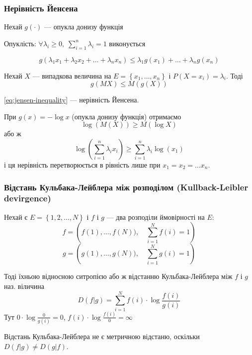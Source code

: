 \subsubsection{Нерівність Йенсена}
\begin{theorem}
  Нехай $g(\cdot)$ --- опукла донизу функція

  Опуклість: $\forall \lambda_i \geq 0, \; \sum_{i=1}^{n} \lambda_i = 1$ виконується

  \[ g(\lambda_1 x_1 + \lambda_2 x_2 + \ldots + \lambda_n x_n) \leq \lambda_1 g(x_1) +
  \ldots + \lambda_n g(x_n) \] 

  Нехай $X$ --- випадкова величина на $E = \left\{ x_1, \ldots, x_n \right\}$
  і $P\left( X = x_i \right)  = \lambda_i$. Тоді
  \begin{equation} \label{eq:jensen-inequality}
  g\left( MX \right) \leq M\left( g(X) \right)
  \end{equation}

  \ref{eq:jensen-inequality} --- нерівність Йенсена.
  
  При $g(x) = - \log x$ (опукла донизу функція) отримаємо
  \[ \log\left( M(X) \right) \geq M\left( \log X \right)  \] 
  або ж
  \[ \log\left( \sum_{i=1}^{n} \lambda_i x_i \right) \geq \sum_{i=1}^{n} \lambda_i \log(x_1) \] 
  і ця нерівність перетворюється в рівність лише при $x_1 = x_2 = \ldots x_n$.
\end{theorem}

\subsubsection{Відстань Кульбака-Лейблера між розподілом (Kullback-Leibler devirgence)}

\begin{definition}
  Нехай є $E = \left\{ 1, 2, \ldots, N \right\} $ і $f$ і $g$ --- два розподіли ймовірності на $E$:
 \[ f = \left( f(1), \ldots, f(N)), \quad \sum_{i=1}^{N} f(i) = 1 \right)  \] 
 \[ g = \left( g(1), \ldots, g(N)), \quad \sum_{i=1}^{N} g(i) = 1 \right)  \] 

 Тоді їхньою відносною ситропією або ж відстанню Кульбака-Лейблера між $f$ і $g$ наз. віличина
 \[ D\left( f|g \right) = \sum_{i=1}^{N} f(i) \cdot \log \frac{f(i)}{g(i)} \] 
 Тут $0 \cdot \log \frac{0}{g(i)} = 0$, $f(i) \cdot \log \frac{f(i)}{0} = \infty$
\end{definition}

\begin{remark}
Відстань Кульбака-Лейблера не є метричною відстаню, оскільки $D(f|g) \not= D(g|f)$.
\end{remark}

